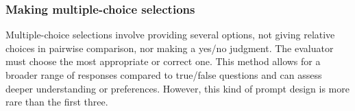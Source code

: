     
    
    
    





\subsubsection{\textbf{Making multiple-choice selections}}
Multiple-choice selections involve providing several options, not giving relative choices in pairwise comparison, nor making a yes/no judgment.
The evaluator must choose the most appropriate or correct one. This method allows for a broader range of responses compared to true/false questions and can assess deeper understanding or preferences. However, this kind of prompt design is more rare than the first three.


    

